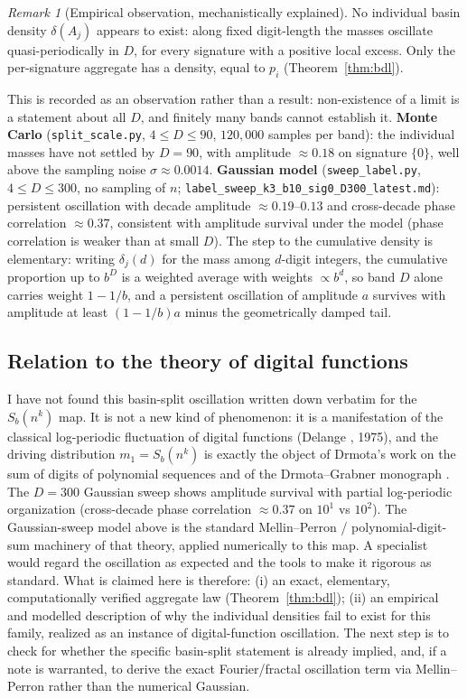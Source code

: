 \documentclass[11pt]{article}
\theoremstyle{definition}
\theoremstyle{remark}
\newtheorem{remark}[theorem]{Remark}
\begin{document}
\begin{remark}[Empirical observation, mechanistically explained]\label{rem:result}
No individual basin density $\delta(A_j)$ appears to exist: along fixed digit-length the masses oscillate quasi-periodically in $D$, for every signature with a positive local excess. Only the per-signature aggregate has a density, equal to $p_i$ (Theorem~\ref{thm:bdl}).

This is recorded as an observation rather than a result: non-existence of a limit is a statement about all $D$, and finitely many bands cannot establish it. \textbf{Monte Carlo} (\texttt{split\_scale.py}, $4 \le D \le 90$, $120{,}000$ samples per band): the individual masses have not settled by $D=90$, with amplitude $\approx 0.18$ on signature $\{0\}$, well above the sampling noise $\sigma \approx 0.0014$. \textbf{Gaussian model} (\texttt{sweep\_label.py}, $4 \le D \le 300$, no sampling of $n$; \texttt{label\_sweep\_k3\_b10\_sig0\_D300\_latest.md}): persistent oscillation with decade amplitude $\approx 0.19$--$0.13$ and cross-decade phase correlation $\approx 0.37$, consistent with amplitude survival under the model (phase correlation is weaker than at small $D$). The step to the cumulative density is elementary: writing $\delta_j(d)$ for the mass among $d$-digit integers, the cumulative proportion up to $b^D$ is a weighted average with weights $\propto b^d$, so band $D$ alone carries weight $1-1/b$, and a persistent oscillation of amplitude $a$ survives with amplitude at least $(1-1/b)a$ minus the geometrically damped tail.
\end{remark}

\subsection{Relation to the theory of digital functions}

I have not found this basin-split oscillation written down verbatim for the $S_b(n^k)$ map. It is not a new kind of phenomenon: it is a manifestation of the classical log-periodic fluctuation of digital functions (Delange \cite{delange}, 1975), and the driving distribution $m_1 = S_b(n^k)$ is exactly the object of Drmota's work on the sum of digits of polynomial sequences \cite{drmota-poly} and of the Drmota--Grabner monograph \cite{drmota-grabner}. The $D=300$ Gaussian sweep shows amplitude survival with partial log-periodic organization (cross-decade phase correlation $\approx 0.37$ on $10^1$ vs $10^2$). The Gaussian-sweep model above is the standard Mellin--Perron / polynomial-digit-sum machinery of that theory, applied numerically to this map. A specialist would regard the oscillation as expected and the tools to make it rigorous as standard. What is claimed here is therefore: (i) an exact, elementary, computationally verified aggregate law (Theorem~\ref{thm:bdl}); (ii) an empirical and modelled description of why the individual densities fail to exist for this family, realized as an instance of digital-function oscillation. The next step is to check \cite{delange,drmota-poly,drmota-grabner} for whether the specific basin-split statement is already implied, and, if a note is warranted, to derive the exact Fourier/fractal oscillation term via Mellin--Perron rather than the numerical Gaussian.
\end{document}
